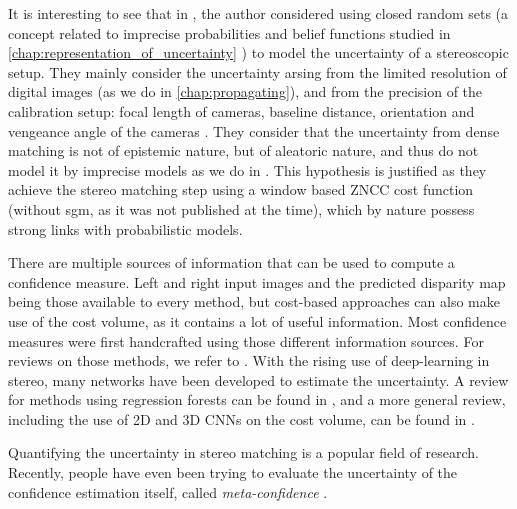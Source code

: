 \begin{remark}
    It is interesting to see that in \cite{quinio_random_1992}, the author considered using closed random sets (a concept related to imprecise probabilities and belief functions studied in \cref{chap:representation_of_uncertainty} \cite{quinio_random_1991}) to model the uncertainty of a stereoscopic setup. They mainly consider the uncertainty arsing from the limited resolution of digital images (as we do in \cref{chap:propagating}), and from the precision of the calibration setup: focal length of cameras, baseline distance, orientation and vengeance angle of the cameras \etc. They consider that the uncertainty from dense matching is not of epistemic nature, but of aleatoric nature, and thus do not model it by imprecise models as we do in . This hypothesis is justified as they achieve the stereo matching step using a window based ZNCC cost function (without \acrshort{sgm}, as it was not published at the time), which by nature possess strong links with probabilistic models.
\end{remark}

There are multiple sources of information that can be used to compute a confidence measure. Left and right input images and the predicted disparity map being those available to every method, but cost-based approaches can also make use of the cost volume, as it contains a lot of useful information. Most confidence measures were first handcrafted using those different information sources. For reviews on those methods, we refer to \cite{egnal_stereo_2004, hu_quantitative_2012, poggi_quantitative_2017}. With the rising use of deep-learning in stereo, many networks have been developed to estimate the uncertainty. A review for methods using regression forests can be found in \cite{min-gyu_park_leveraging_2015}, and a more general review, including the use of 2D and 3D CNNs on the cost volume, can be found in \cite{poggi_confidence_2021}.

\begin{remark}
     Quantifying the uncertainty in stereo matching is a popular field of research. Recently, people have even been trying to evaluate the uncertainty of the confidence estimation itself, called \textit{meta-confidence} \cite{kim_meta-confidence_2022}.
\end{remark}

